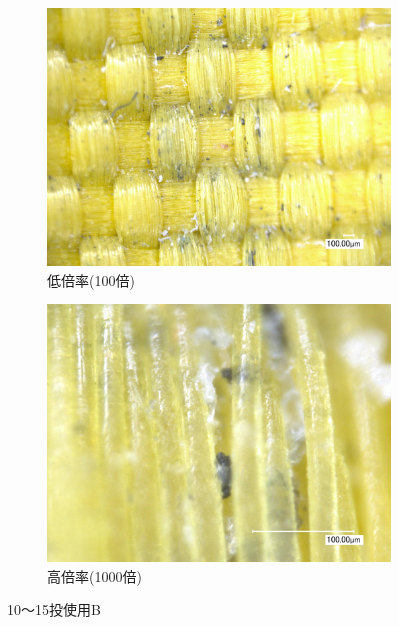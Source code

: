 \documentclass[main]{subfiles}
\begin{document}
\begin{figure}[H]
    \centering
    \begin{subfigure}[htbp]{0.45\linewidth}
        \centering
        \includegraphics[keepaspectratio, width=0.8\linewidth]{figures/縁/カーリングパッド10-15低倍率B.jpg}
        \caption{低倍率(100倍)}
        \label{fig:label}
    \end{subfigure}
    \begin{subfigure}[htbp]{0.45\linewidth}
        \centering
        \includegraphics[keepaspectratio, width=0.8\linewidth]{figures/縁/カーリングパッド10-15B.jpg}
        \caption{高倍率(1000倍)}
        \label{fig:label}
    \end{subfigure}
    \caption{10～15投使用B}
    \label{fig:3}
\end{figure}
\end{document}
